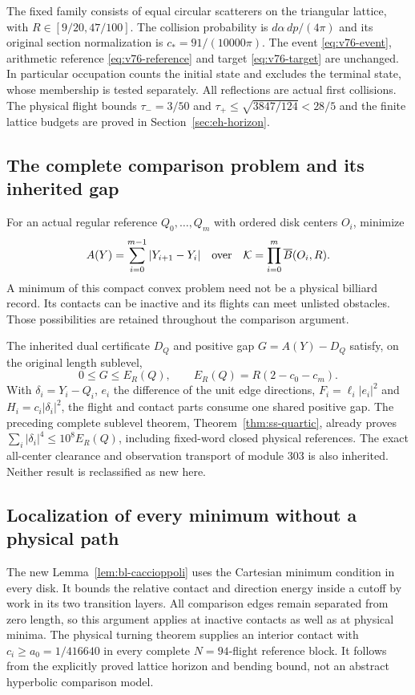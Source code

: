 \documentclass[11pt,reqno]{amsart}
\numberwithin{equation}{section}
\theoremstyle{definition}\newtheorem{definition}[theorem]{Definition}
\theoremstyle{remark}\newtheorem{remark}[theorem]{Remark}
\begin{document}
The fixed family consists of equal circular scatterers on the
triangular lattice, with $R\in[9/20,47/100]$.  The collision
probability is $d\alpha\,dp/(4\pi)$ and its original section
normalization is $c_*=91/(10000\pi)$.  The event
\eqref{eq:v76-event}, arithmetic reference \eqref{eq:v76-reference}
and target \eqref{eq:v76-target} are unchanged.  In particular
occupation counts the initial state and excludes the terminal
state, whose membership is tested separately.  All reflections are
actual first collisions.  The physical flight bounds
$\tau_-=3/50$ and $\tau_+\le\sqrt{3847/124}<28/5$ and the finite
lattice budgets are proved in Section~\ref{sec:eh-horizon}.

\subsection*{The complete comparison problem and its inherited gap}
For an actual regular reference $Q_0,\ldots,Q_m$ with ordered
disk centers $O_i$, minimize
\[
 A(Y)=\sum_{i=0}^{m-1}|Y_{i+1}-Y_i|
 \quad\hbox{over}\quad
 \mathcal K=\prod_{i=0}^{m}\overline B(O_i,R).
\]
A minimum of this compact convex problem need not be a physical
billiard record.  Its contacts can be inactive and its flights can
meet unlisted obstacles.  Those possibilities are retained throughout
the comparison argument.

The inherited dual certificate $D_Q$ and positive gap
$G=A(Y)-D_Q$ satisfy, on the original length sublevel,
\[
 0\le G\le E_R(Q),\qquad E_R(Q)=R(2-c_0-c_m).
\]
With $\delta_i=Y_i-Q_i$, $e_i$ the difference of the unit edge
directions, $F_i=\ell_i|e_i|^2$ and
$H_i=c_i|\delta_i|^2$, the flight and contact parts consume one
shared positive gap.  The preceding complete sublevel theorem,
Theorem~\ref{thm:ss-quartic}, already proves
$\sum_i|\delta_i|^4\le10^8E_R(Q)$, including fixed-word closed
physical references.  The exact all-center clearance and observation
transport of module 303 is also inherited.  Neither result is
reclassified as new here.

\subsection*{Localization of every minimum without a physical path}
The new Lemma~\ref{lem:bl-caccioppoli} uses the Cartesian minimum
condition in every disk.  It bounds the relative contact and
direction energy inside a cutoff by work in its two transition
layers.  All comparison edges remain separated from zero length,
so this argument applies at inactive contacts as well as at
physical minima.  The physical turning theorem supplies an
interior contact with $c_i\ge a_0=1/416640$ in every complete
$N=94$-flight reference block.  It follows from the explicitly
proved lattice horizon and bending bound, not an abstract
hyperbolic comparison model.
\end{document}
